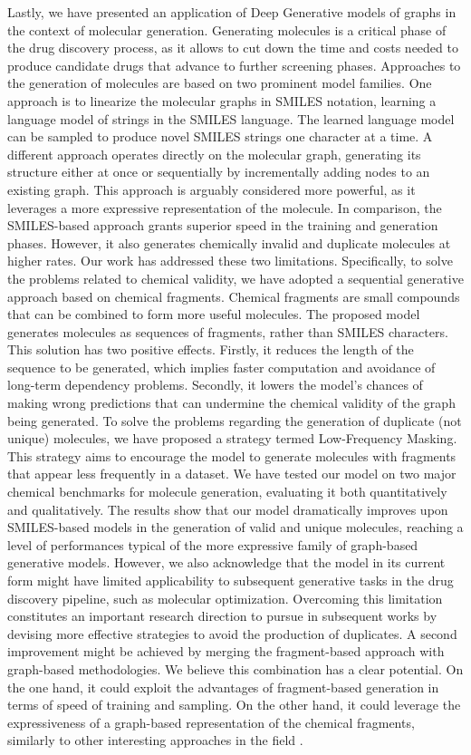 Lastly, we have presented an application of Deep Generative models of graphs in the context of molecular generation. Generating molecules is a critical phase of the drug discovery process, as it allows to cut down the time and costs needed to produce candidate drugs that advance to further screening phases. Approaches to the generation of molecules are based on two prominent model families. One approach is to linearize the molecular graphs in SMILES notation, learning a language model of strings in the SMILES language. The learned language model can be sampled to produce novel SMILES strings one character at a time. A different approach operates directly on the molecular graph, generating its structure either at once or sequentially by incrementally adding nodes to an existing graph. This approach is arguably considered more powerful, as it leverages a more expressive representation of the molecule. In comparison, the SMILES-based approach grants superior speed in the training and generation phases. However, it also generates chemically invalid and duplicate molecules at higher rates. Our work has addressed these two limitations. Specifically, to solve the problems related to chemical validity, we have adopted a sequential generative approach based on chemical fragments. Chemical fragments are small compounds that can be combined to form more useful molecules. The proposed model generates molecules as sequences of fragments, rather than SMILES characters. This solution has two positive effects. Firstly, it reduces the length of the sequence to be generated, which implies faster computation and avoidance of long-term dependency problems. Secondly, it lowers the model's chances of making wrong predictions that can undermine the chemical validity of the graph being generated. To solve the problems regarding the generation of duplicate (\ie not unique) molecules, we have proposed a strategy termed Low-Frequency Masking. This strategy aims to encourage the model to generate molecules with fragments that appear less frequently in a dataset. We have tested our model on two major chemical benchmarks for molecule generation, evaluating it both quantitatively and qualitatively. The results show that our model dramatically improves upon SMILES-based models in the generation of valid and unique molecules, reaching a level of performances typical of the more expressive family of graph-based generative models. However, we also acknowledge that the model in its current form might have limited applicability to subsequent generative tasks in the drug discovery pipeline, such as molecular optimization. Overcoming this limitation constitutes an important research direction to pursue in subsequent works by devising more effective strategies to avoid the production of duplicates. A second improvement might be achieved by merging the fragment-based approach with graph-based methodologies. We believe this combination has a clear  potential. On the one hand, it could exploit the advantages of fragment-based generation in terms of speed of training and sampling. On the other hand, it could leverage the expressiveness of a graph-based representation of the chemical fragments, similarly to other interesting approaches in the field \citep{jin2019multimodalmoltranslation,bradshaw2020barking}.
